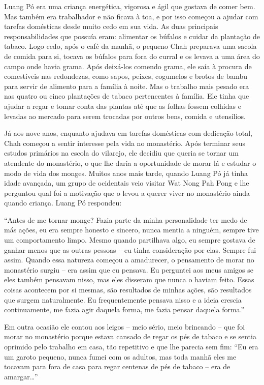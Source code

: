 Luang Pó era uma criança energética, vigorosa e ágil que gostava de
comer bem. Mas também era trabalhador e não ficava à toa, e por isso
começou a ajudar com tarefas domésticas desde muito cedo em sua vida. As
duas principais responsabilidades que possuía eram: alimentar os búfalos
e cuidar da plantação de tabaco. Logo cedo, após o café da manhã, o
pequeno Chah preparava uma sacola de comida para si, tocava os búfalos
para fora do curral e os levava a uma área do campo onde havia grama.
Após deixá-los comendo grama, ele saía à procura de comestíveis nas
redondezas, como sapos, peixes, cogumelos e brotos de bambu para servir
de alimento para a família à noite. Mas o trabalho mais pesado era nas
quatro ou cinco plantações de tabaco pertencentes à família. Ele tinha
que ajudar a regar e tomar conta das plantas até que as folhas fossem
colhidas e levadas ao mercado para serem trocadas por outros bens,
comida e utensílios.

Já aos nove anos, enquanto ajudava em tarefas domésticas com dedicação
total, Chah começou a sentir interesse pela vida no monastério. Após
terminar seus estudos primários na escola do vilarejo, ele decidiu que
queria se tornar um atendente do monastério, o que lhe daria a
oportunidade de morar lá e estudar o modo de vida dos monges. Muitos
anos mais tarde, quando Luang Pó já tinha idade avançada, um grupo de
ocidentais veio visitar Wat Nong Pah Pong e lhe perguntou qual foi a
motivação que o levou a querer viver no monastério ainda quando criança.
Luang Pó respondeu:

``Antes de me tornar monge? Fazia parte da minha personalidade ter medo
de más ações, eu era sempre honesto e sincero, nunca mentia a ninguém,
sempre tive um comportamento limpo. Mesmo quando partilhava algo, eu
sempre gostava de ganhar menos que as outras pessoas -- eu tinha
consideração por elas. Sempre fui assim. Quando essa natureza começou a
amadurecer, o pensamento de morar no monastério surgiu -- era assim que
eu pensava. Eu perguntei aos meus amigos se eles também pensavam nisso,
mas eles disseram que nunca o haviam feito. Essas coisas acontecem por
si mesmas, são resultados de minhas ações, são resultados que surgem
naturalmente. Eu frequentemente pensava nisso e a ideia crescia
continuamente, me fazia agir daquela forma, me fazia pensar daquela
forma.''

Em outra ocasião ele contou aos leigos -- meio sério, meio brincando --
que foi morar no monastério porque estava cansado de regar os pés de
tabaco e se sentia oprimido pelo trabalho em casa, tão repetitivo e que
lhe parecia sem fim: ``Eu era um garoto pequeno, nunca fumei com os
adultos, mas toda manhã eles me tocavam para fora de casa para regar
centenas de pés de tabaco -- era de amargar\ldots{}''

